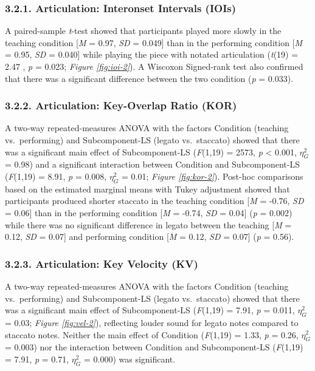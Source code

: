 \documentclass[
  english,
  man,floatsintext]{apa6}
\begin{document}
\hypertarget{articulation-interonset-intervals-iois-1}{%
\subsubsection{3.2.1. Articulation: Interonset Intervals (IOIs)}\label{articulation-interonset-intervals-iois-1}}

A paired-sample \emph{t}-test showed that participants played more slowly in the teaching condition {[}\emph{M} = 0.97, \emph{SD} = 0.049{]} than in the performing condition {[}\emph{M} = 0.95, \emph{SD} = 0.040{]} while playing the piece with notated articulation (\emph{t}(19) = 2.47
, \emph{p} = 0.023; \emph{Figure \ref{fig:ioi-2}}). A Wiscoxon Signed-rank test also confirmed that there was a significant difference between the two condition (\emph{p} = 0.033).

\hypertarget{articulation-key-overlap-ratio-kor}{%
\subsubsection{3.2.2. Articulation: Key-Overlap Ratio (KOR)}\label{articulation-key-overlap-ratio-kor}}

A two-way repeated-measures ANOVA with the factors Condition (teaching vs.~performing) and Subcomponent-LS (legato vs.~staccato) showed that there was a significant main effect of Subcomponent-LS (\emph{F}(1,19) = 2573, \emph{p} \textless{} 0.001, \(\eta_G^2\) = 0.98) and a significant interaction between Condition and Subcomponent-LS (\emph{F}(1,19) = 8.91, \emph{p} = 0.008, \(\eta_G^2\) = 0.01; \emph{Figure \ref{fig:kor-2}}). Post-hoc comparisons based on the estimated marginal means with Tukey adjustment showed that participants produced shorter staccato in the teaching condition {[}\emph{M} = -0.76, \emph{SD} = 0.06{]} than in the performing condition {[}\emph{M} = -0.74, \emph{SD} = 0.04{]} (\emph{p} = 0.002) while there was no significant difference in legato between the teaching {[}\emph{M} = 0.12, \emph{SD} = 0.07{]} and performing condition {[}\emph{M} = 0.12, \emph{SD} = 0.07{]} (\emph{p} = 0.56).

\hypertarget{articulation-key-velocity-kv-1}{%
\subsubsection{3.2.3. Articulation: Key Velocity (KV)}\label{articulation-key-velocity-kv-1}}

A two-way repeated-measures ANOVA with the factors Condition (teaching vs.~performing) and Subcomponent-LS (legato vs.~staccato) showed that there was a significant main effect of Subcomponent-LS (\emph{F}(1,19) = 7.91, \emph{p} = 0.011, \(\eta_G^2\) = 0.03; \emph{Figure \ref{fig:vel-2}}), reflecting louder sound for legato notes compared to staccato notes. Neither the main effect of Condition (\emph{F}(1,19) = 1.33, \emph{p} = 0.26, \(\eta_G^2\) = 0.003) nor the interaction between Condition and Subcomponent-LS (\emph{F}(1,19) = 7.91, \emph{p} = 0.71, \(\eta_G^2\) = 0.000) was significant.
\end{document}
